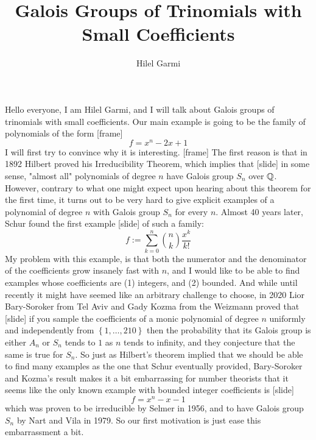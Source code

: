 \documentclass[../../main.tex]{subfiles}
\begin{document}
\title{
  Galois Groups of Trinomials with Small Coefficients
}
\author{Hilel Garmi}
\maketitle

Hello everyone, I am Hilel Garmi, and I will talk about Galois groups of trinomials with small coefficients.
Our main example is going to be the family of polynomials of the form [frame]
\[
  f = x^n - 2x + 1
\]
I will first try to convince why it is interesting.
[frame]
The first reason is that in 1892 Hilbert proved his Irreducibility Theorem, which implies that [slide] in some sense, "almost all" polynomials of degree $n$ have Galois group $S_n$ over $\mathbb{Q}$.
However, contrary to what one might expect upon hearing about this theorem for the first time, it turns out to be very hard to give explicit examples of a polynomial of degree $n$ with Galois group $S_n$ for every $n$.
Almost 40 years later, Schur found the first example [slide] of such a family:
\[
  f := \sum_{k=0}^n \binom{n}{k} \frac{x^k}{k!}
\]
My problem with this example, is that both the numerator and the denominator of the coefficients grow insanely fast with $n$, and I would like to be able to find examples whose coefficients are (1) integers, and (2) bounded.
And while until recently it might have seemed like an arbitrary challenge to choose, in 2020 Lior Bary-Soroker from Tel Aviv and Gady Kozma from the Weizmann proved that [slide] if you sample the coefficients of a monic polynomial of degree $n$ uniformly and independently from $\left\{ 1,\dots,210 \right\}$ then the probability that its Galois group is either $A_n$ or $S_n$ tends to $1$ as $n$ tends to infinity, and they conjecture that the same is true for $S_n$.
So just as Hilbert's theorem implied that we should be able to find many examples as the one that Schur eventually provided, Bary-Soroker and Kozma's result makes it a bit embarrassing for number theorists that it seems like the only known example with bounded integer coefficients is [slide] 
\[
  f = x^n - x - 1
\]
which was proven to be irreducible by Selmer in 1956, and to have Galois group $S_n$ by Nart and Vila in 1979.
So our first motivation is just ease this embarrassment a bit.

\end{document}
